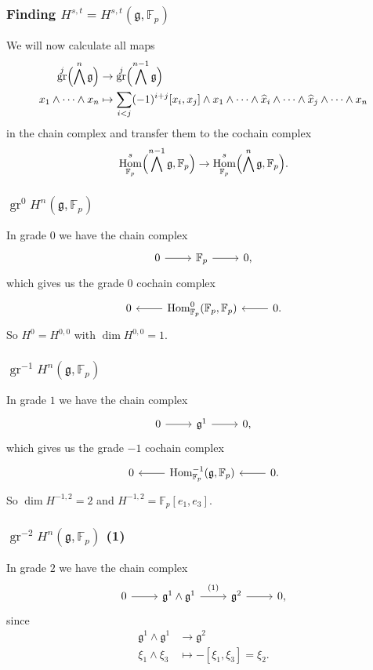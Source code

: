 \documentclass{beamer}
\newcommand*\F{\mathbb{F}}
\DeclareMathOperator{\Hom}{Hom} %
\DeclareMathOperator{\gr}{gr} %
\newcommand*{\lie}[1]{\mathfrak{#1}} %
\begin{document}
\begin{frame}
  \frametitle{Finding $H^{s,t} = H^{s,t}(\lie{g},\F_{p})$}

  We will now calculate all maps
  \begin{align*}
    \gr^{j} \Bigl( \bigwedge^{n} \lie{g} \Bigr) &\to \gr^{j} \Bigl( \bigwedge^{n-1} \lie{g} \Bigr) \\
    x_{1} \wedge \dotsb \wedge x_{n} &\mapsto \sum_{i<j} (-1)^{i+j} [x_{i},x_{j}] \wedge x_{1} \wedge \dotsb \wedge \widehat{x}_{i} \wedge \dotsb \wedge \widehat{x}_{j} \wedge \dotsb \wedge x_{n}
  \end{align*}
  in the chain complex and transfer them to the cochain complex
  \[
    \Hom_{\F_{p}}^{s}\Bigl( \bigwedge^{n-1}\lie{g},\F_{p} \Bigr) \to \Hom_{\F_{p}}^{s}\Bigl( \bigwedge^{n}\lie{g},\F_{p} \Bigr).
  \]
\end{frame}

\begin{frame}[fragile]
  \frametitle{$\gr^{0} H^{n}(\lie{g},\F_{p})$}

  In grade $0$ we have the chain complex
  \[
    \begin{tikzcd}
      0 \ar[r] & \F_{p} \ar[r] & 0,
    \end{tikzcd}
  \]
  which gives us the grade $0$ cochain complex
  \[
    \begin{tikzcd}
      0 & \ar[l] \Hom_{\F_{p}}^{0}(\F_{p},\F_{p}) & \ar[l] 0.
    \end{tikzcd}
  \]
  So $H^{0} = H^{0,0}$ with $\dim H^{0,0} = 1$.
\end{frame}

\begin{frame}[fragile]
  \frametitle{$\gr^{-1} H^{n}(\lie{g},\F_{p})$}

  In grade $1$ we have the chain complex
  \[
    \begin{tikzcd}
      0 \ar[r] & \lie{g}^{1} \ar[r] & 0,
    \end{tikzcd}
  \]
  which gives us the grade $-1$ cochain complex
  \[
    \begin{tikzcd}
      0 & \ar[l] \Hom_{\F_{p}}^{-1}(\lie{g},\F_{p}) & \ar[l] 0.
    \end{tikzcd}
  \]
  So $\dim H^{-1,2} = 2$ and $H^{-1,2} = \F_{p}[e_{1},e_{3}]$.
\end{frame}


\begin{frame}[fragile]
  \frametitle{$\gr^{-2} H^{n}(\lie{g},\F_{p})$ (1)}

  In grade $2$ we have the chain complex
  \[
    \begin{tikzcd}
      0 \ar[r] & \lie{g}^{1} \wedge \lie{g}^{1} \ar[r, "{(1)}" {yshift=2pt}] & \lie{g}^{2} \ar[r] & 0,
    \end{tikzcd}
  \]
  since
  \begin{align*}
    \lie{g}^{1} \wedge \lie{g}^{1} &\to \lie{g}^{2} \\
    \xi_{1} \wedge \xi_{3} &\mapsto -[\xi_{1},\xi_{3}] = \xi_{2}.
  \end{align*}
\end{frame}
\end{document}
